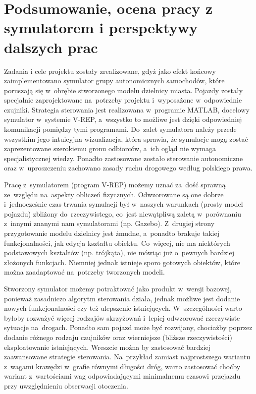 \documentclass[11pt, a4paper, twoside]{report}
\begin{document}
\section{Podsumowanie, ocena pracy z symulatorem i perspektywy dalszych prac}
Zadania i cele projektu zostały zrealizowane, gdyż jako efekt końcowy zaimplementowano symulator grupy autonomicznych samochodów, które poruszają się w~obrębie stworzonego modelu dzielnicy miasta. Pojazdy zostały specjalnie zaprojektowane na~potrzeby projektu i~wyposażone w~odpowiednie czujniki. Strategia sterowania jest realizowana w~programie MATLAB, docelowy symulator w~systemie \mbox{V-REP}, a~wszystko to możliwe jest dzięki odpowiedniej komunikacji pomiędzy tymi programami. Do~zalet symulatora należy przede wszystkim jego intuicyjna wizualizacja, która sprawia, że symulacje mogą zostać zaprezentowane szerokiemu gronu odbiorców, a~ich ogląd nie wymaga specjalistycznej wiedzy. Ponadto zastosowane zostało sterowanie autonomiczne oraz w~uproszczeniu zachowano zasady ruchu drogowego według polskiego prawa.
	
Pracę z~symulatorem (program V-REP) możemy uznać za~dość sprawną ze~względu na~aspekty obliczeń fizycznych. Odwzorowane są one dobrze i~jednocześnie czas trwania symulacji był w~naszych warunkach (prosty model pojazdu) zbliżony do~rzeczywistego, co~jest niewątpliwą zaletą w~porównaniu z~innymi znanymi nam symulatorami (np. Gazebo). Z~drugiej strony przygotowanie modelu dzielnicy jest żmudne, a~ponadto brakuje takiej funkcjonalności, jak edycja kształtu obiektu. Co~więcej, nie ma niektórych podstawowych kształtów (np. trójkąta), nie mówiąc już o~pewnych bardziej złożonych funkcjach. Niemniej jednak istnieje sporo gotowych obiektów, które można zaadaptować na~potrzeby tworzonych modeli. 

Stworzony symulator możemy potraktować jako produkt w~wersji bazowej, ponieważ zasadniczo algorytm sterowania działa, jednak możliwe jest dodanie nowych funkcjonalności czy też ulepszenie istniejących. W~szczególności warto byłoby rozważyć więcej rodzajów skrzyżowań i~lepiej odwzorować rzeczywiste sytuacje na~drogach. Ponadto sam pojazd może być rozwijany, chociażby poprzez dodanie różnego rodzaju czujników oraz wierniejsze (bliższe rzeczywistości) eksploatowanie istniejących. Wreszcie można by zastosować bardziej zaawansowane strategie sterowania. Na~przykład zamiast najprostszego wariantu z~wagami krawędzi w~grafie równymi długości dróg, warto zastosować choćby wariant z~wartościami wag odpowiadającymi minimalnemu czasowi przejazdu przy uwzględnieniu obserwacji otoczenia. 
 
	
		
\end{document}
